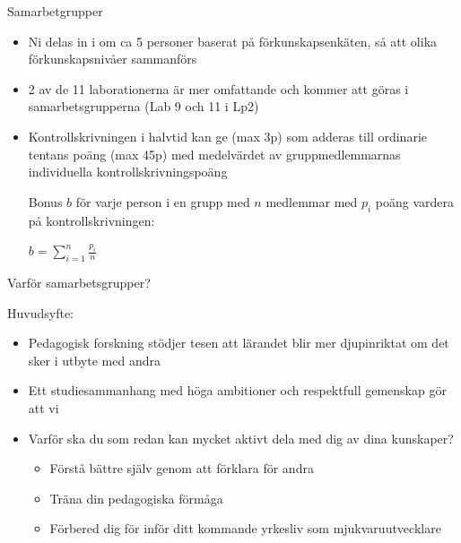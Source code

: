 \documentclass{lecturenotes}
\begin{document}
\begin{Slide}{Samarbetgrupper}\footnotesize
\begin{itemize}
\item Ni delas in i  om ca 5 personer baserat på förkunskapsenkäten, så att olika förkunskapsnivåer sammanförs
\item 2 av de 11 laborationerna är mer omfattande  och kommer att göras i samarbetsgrupperna (Lab 9 och 11 i Lp2) \\ \vspace{1em}
\item Kontrollskrivningen i halvtid kan ge  (max 3p) som adderas till ordinarie tentans poäng (max 45p) med medelvärdet av gruppmedlemmarnas individuella kontrollskrivningspoäng 
\scriptsize \parbox{7cm}{Bonus $b$ för varje person i en grupp med $n$ medlemmar med $p_i$ poäng vardera på kontrollskrivningen:} 
 \hspace{5mm} $\displaystyle b = \sum\limits_{i=1}^n \frac{p_i}{n}$
\end{itemize}
\end{Slide}

\begin{Slide}{Varför samarbetsgrupper?}

Huvudsyfte: 

\begin{itemize}
\item Pedagogisk forskning stödjer tesen att lärandet blir mer djupinriktat om det sker i utbyte med andra
\item Ett studiesammanhang med höga ambitioner och respektfull gemenskap gör att vi 
\item Varför ska du som redan kan mycket aktivt dela med dig av dina kunskaper?
\begin{itemize}
\item Förstå bättre själv genom att förklara för andra
\item Träna din pedagogiska förmåga
\item Förbered dig för inför ditt kommande yrkesliv som mjukvaruutvecklare 
\end{itemize}
\end{itemize}
\end{Slide}
\end{document}
